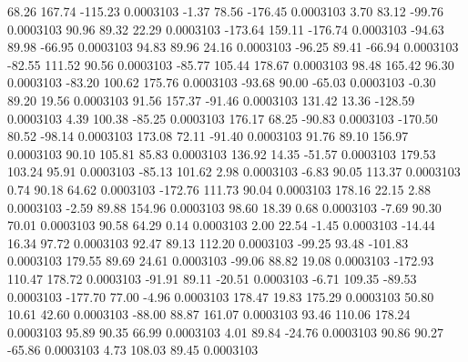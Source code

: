        68.26      167.74     -115.23     0.0003103
       -1.37       78.56     -176.45     0.0003103
        3.70       83.12      -99.76     0.0003103
       90.96       89.32       22.29     0.0003103
     -173.64      159.11     -176.74     0.0003103
      -94.63       89.98      -66.95     0.0003103
       94.83       89.96       24.16     0.0003103
      -96.25       89.41      -66.94     0.0003103
      -82.55      111.52       90.56     0.0003103
      -85.77      105.44      178.67     0.0003103
       98.48      165.42       96.30     0.0003103
      -83.20      100.62      175.76     0.0003103
      -93.68       90.00      -65.03     0.0003103
       -0.30       89.20       19.56     0.0003103
       91.56      157.37      -91.46     0.0003103
      131.42       13.36     -128.59     0.0003103
        4.39      100.38      -85.25     0.0003103
      176.17       68.25      -90.83     0.0003103
     -170.50       80.52      -98.14     0.0003103
      173.08       72.11      -91.40     0.0003103
       91.76       89.10      156.97     0.0003103
       90.10      105.81       85.83     0.0003103
      136.92       14.35      -51.57     0.0003103
      179.53      103.24       95.91     0.0003103
      -85.13      101.62        2.98     0.0003103
       -6.83       90.05      113.37     0.0003103
        0.74       90.18       64.62     0.0003103
     -172.76      111.73       90.04     0.0003103
      178.16       22.15        2.88     0.0003103
       -2.59       89.88      154.96     0.0003103
       98.60       18.39        0.68     0.0003103
       -7.69       90.30       70.01     0.0003103
       90.58       64.29        0.14     0.0003103
        2.00       22.54       -1.45     0.0003103
      -14.44       16.34       97.72     0.0003103
       92.47       89.13      112.20     0.0003103
      -99.25       93.48     -101.83     0.0003103
      179.55       89.69       24.61     0.0003103
      -99.06       88.82       19.08     0.0003103
     -172.93      110.47      178.72     0.0003103
      -91.91       89.11      -20.51     0.0003103
       -6.71      109.35      -89.53     0.0003103
     -177.70       77.00       -4.96     0.0003103
      178.47       19.83      175.29     0.0003103
       50.80       10.61       42.60     0.0003103
      -88.00       88.87      161.07     0.0003103
       93.46      110.06      178.24     0.0003103
       95.89       90.35       66.99     0.0003103
        4.01       89.84      -24.76     0.0003103
       90.86       90.27      -65.86     0.0003103
        4.73      108.03       89.45     0.0003103
